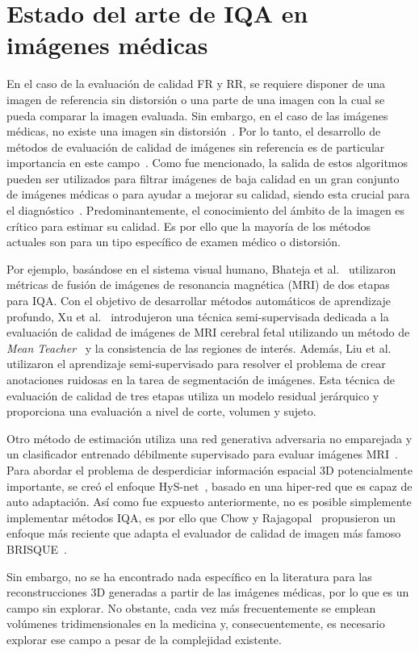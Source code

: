 \section{Estado del arte de IQA en imágenes médicas}
En el caso de la evaluación de calidad FR y RR, se requiere disponer 
de una imagen de referencia sin distorsión o una parte de una imagen con la cual 
se pueda comparar la imagen evaluada. Sin embargo, en el caso de las imágenes médicas, 
no existe una imagen sin distorsión~\cite{DicomDistortionsExample}. 
Por lo tanto, el desarrollo de métodos de evaluación de calidad de imágenes 
sin referencia es de particular importancia en este campo~\cite{LGP, BRISQUE, IQA-CNN, DIQaM, Hallucinated-IQA}.
Como fue mencionado, la salida de estos algoritmos pueden ser utilizados 
para filtrar imágenes de baja calidad en un gran conjunto de imágenes médicas o 
para ayudar a mejorar su calidad, siendo esta crucial para el diagnóstico~\cite{DicomDistortionsExample}.
Predominantemente, el conocimiento del ámbito de la imagen es crítico para estimar 
su calidad. Es por ello que la mayoría de los métodos actuales son para un tipo específico 
de examen médico o distorsión.

Por ejemplo, basándose en el sistema visual humano, 
Bhateja et al.~\cite{MultiModalMRIFusionMethod} utilizaron métricas de fusión
de imágenes de resonancia magnética (MRI) de dos etapas para IQA.
Con el objetivo de desarrollar métodos automáticos de aprendizaje profundo,
Xu et al.~\cite{SemiSupervisedMRIFetalBrain} introdujeron una técnica semi-supervisada dedicada a la evaluación de 
calidad de imágenes de MRI cerebral fetal utilizando un método de 
\emph{Mean Teacher}~\cite{MeanTeacher} y la consistencia de las regiones de interés. 
Además, Liu et al.~\cite{IQAForPediatricMRIWithNoisySegmentation} utilizaron el aprendizaje semi-supervisado para resolver 
el problema de crear anotaciones ruidosas en la tarea de segmentación de imágenes. 
Esta técnica de evaluación de calidad de tres etapas utiliza un modelo residual 
jerárquico y proporciona una evaluación a nivel de corte, volumen y sujeto. 

Otro método de estimación utiliza una red generativa adversaria no emparejada 
y un clasificador entrenado débilmente supervisado para evaluar imágenes MRI~\cite{MIGAN}.
Para abordar el problema de desperdiciar información espacial 3D potencialmente importante, 
se creó el enfoque HyS-net~\cite{Hys-net}, basado en una hiper-red que es capaz de 
auto adaptación. Así como fue expuesto anteriormente, no es posible 
simplemente implementar métodos IQA, es por ello que Chow y Rajagopal~\cite{MedicalBRISQUE} 
propusieron un enfoque más reciente que adapta el evaluador de calidad de imagen más famoso BRISQUE~\cite{BRISQUE}.

Sin embargo, no se ha encontrado nada específico en la literatura para las 
reconstrucciones 3D generadas a partir de las imágenes médicas, por lo que es un campo sin explorar. 
No obstante, cada vez más frecuentemente se emplean 
volúmenes tridimensionales en la medicina y, consecuentemente, es necesario explorar ese 
campo a pesar de la complejidad existente.
